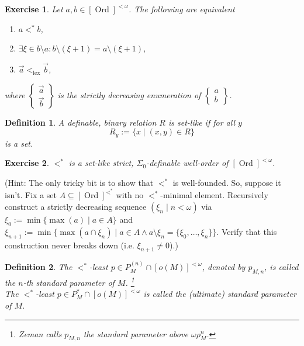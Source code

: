 \documentclass[12pt,a4paper]{article}
\theoremstyle{nicestyle}
\newtheorem{exercise}{Exercise}[subsection]
\newtheorem{definition}{Definition}[subsection]
\DeclareMathOperator{\ord}{Ord}
\DeclareMathOperator{\lex}{lex}
\begin{document}
\begin{exercise}
  Let $a,b \in [\ord]^{<\omega}$. The following are equivalent

  \begin{enumerate}
  \item $a <^{*} b$,
  \item
    $\exists \xi \in b \setminus a \colon b \setminus (\xi + 1) = a
    \setminus (\xi + 1)$,
    \item $\vec{a} <_{\lex} \vec{b}$,
    \end{enumerate}
    where
    $\begin{Bmatrix}
      \vec{a} \\
      \vec{b}
    \end{Bmatrix}$
    is the strictly decreasing enumeration
    of $\begin{Bmatrix}
      a \\
      b
    \end{Bmatrix}$.
  \end{exercise}

  \begin{definition}
    A definable, binary relation $R$ is \emph{set-like} if for all $y$
    \[
      R_{y} := \{ x \mid (x,y) \in R \} 
    \]
    is a set.
  \end{definition}

  \begin{exercise}
    $<^{*}$ is a set-like strict, $\Sigma_{0}$-definable well-order of
    $[\ord]^{< \omega}$.
  \end{exercise}

  (Hint: The only tricky bit is to show that $<^{*}$ is
  well-founded. So, suppose it isn't. Fix a set
  $A \subseteq [\ord]^{<^{*}}$ with no $<^{*}$-minimal
  element. Recursively construct a strictly decreasing sequence
  $(\xi_{n} \mid n < \omega)$ via
  $\xi_{0} := \min \{ \max(a) \mid a \in A \}$ and
  $\xi_{n+1} := \min \{ \max(a \cap \xi_{n}) \mid a \in A \wedge a
  \setminus \xi_{n} = \{ \xi_{0}, \ldots, \xi_{n} \}\}$. Verify that
  this construction never breaks down (i.e. $\xi_{n+1} \neq 0$).)

  \begin{definition}
    The $<^{*}$-least $p \in P^{(n)}_{M} \cap [o(M)]^{< \omega}$,
    denoted by $p_{M,n}$, is called the \emph{$n$-th standard
      parameter of
      $M$}. \footnote{Zeman calls $p_{M,n}$ the standard parameter above $\omega \rho^{n}_{M}$.} \\
    The $<^{*}$-least $p \in P^{*}_{M} \cap [o(M)]^{<\omega}$ is
    called the \emph{(ultimate) standard parameter of $M$}.
  \end{definition}
\end{document}
